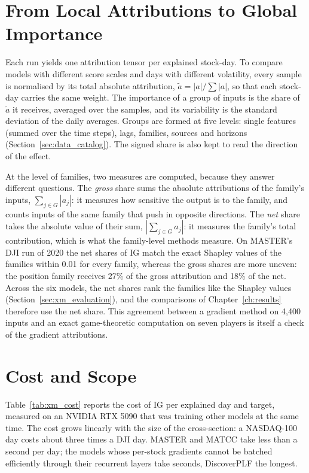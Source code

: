 \section{From Local Attributions to Global Importance}
\label{sec:xm_aggregation}

Each run yields one attribution tensor per explained stock-day. To compare models with different score scales and days with different volatility, every sample is normalised by its total absolute attribution, $\tilde a = |a| / \sum |a|$, so that each stock-day carries the same weight. The importance of a group of inputs is the share of $\tilde a$ it receives, averaged over the samples, and its variability is the standard deviation of the daily averages. Groups are formed at five levels: single features (summed over the time steps), lags, families, sources and horizons (Section~\ref{sec:data_catalog}). The signed share is also kept to read the direction of the effect.

At the level of families, two measures are computed, because they answer different questions. The \emph{gross} share sums the absolute attributions of the family's inputs, $\sum_{j \in G} |a_j|$: it measures how sensitive the output is to the family, and counts inputs of the same family that push in opposite directions. The \emph{net} share takes the absolute value of their sum, $|\sum_{j \in G} a_j|$: it measures the family's total contribution, which is what the family-level methods measure. On MASTER's DJI run of 2020 the net shares of IG match the exact Shapley values of the families within 0.01 for every family, whereas the gross shares are more uneven: the position family receives 27\% of the gross attribution and 18\% of the net. Across the six models, the net shares rank the families like the Shapley values (Section~\ref{sec:xm_evaluation}), and the comparisons of Chapter~\ref{ch:results} therefore use the net share.
This agreement between a gradient method on 4{,}400 inputs and an exact game-theoretic computation on seven players is itself a check of the gradient attributions.

\section{Cost and Scope}
\label{sec:xm_cost}

Table~\ref{tab:xm_cost} reports the cost of IG per explained day and target, measured on an NVIDIA RTX 5090 that was training other models at the same time. The cost grows linearly with the size of the cross-section: a NASDAQ-100 day costs about three times a DJI day. MASTER and MATCC take less than a second per day; the models whose per-stock gradients cannot be batched efficiently through their recurrent layers take seconds, DiscoverPLF the longest.

